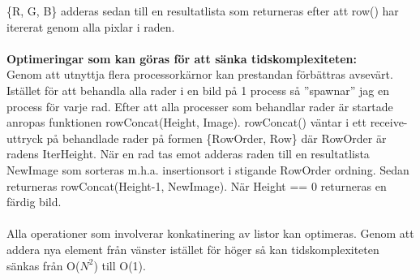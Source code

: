 \documentclass[a4paper, 11pt]{article}
\begin{document}
\{R, G, B\} adderas sedan till en resultatlista som returneras efter att row() har itererat genom alla pixlar i raden. 
\\\\\textbf{Optimeringar som kan göras för att sänka tidskomplexiteten:}
\\Genom att utnyttja flera processorkärnor kan prestandan förbättras avsevärt. Istället för att behandla alla rader i en bild på 1 process så ''spawnar'' jag en process för varje rad. Efter att alla processer som behandlar rader är startade anropas funktionen rowConcat(Height, Image). rowConcat() väntar i ett receive-uttryck på behandlade rader på formen \{RowOrder, Row\} där RowOrder är radens IterHeight. När en rad tas emot adderas raden till en resultatlista NewImage som sorteras m.h.a. insertionsort i stigande RowOrder ordning. Sedan returneras rowConcat(Height-1, NewImage). När Height == 0 returneras en färdig bild.
\\\\Alla operationer som involverar konkatinering av listor kan optimeras. Genom att addera nya element från vänster istället för höger så kan tidskomplexiteten sänkas från O(\begin{math} N^2 \end{math}) till O(1). 
\end{document}
